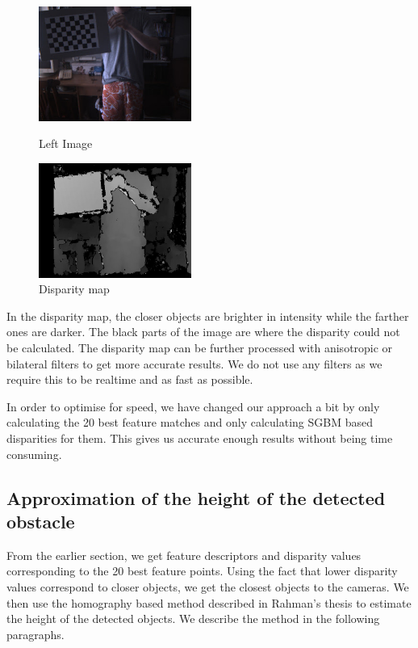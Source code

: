 \documentclass[11pt]{report}
\begin{document}
\begin{figure}
\centering
\parbox{5cm}{
\includegraphics[width=5cm]{left.jpg}
\caption{Left Image}
\label{fig:2figsA}}
\qquad
\begin{minipage}{5cm}
\includegraphics[width=5cm]{disp.jpg}
\caption{Disparity map}
\label{fig:2figsB}
\end{minipage}
\end{figure}




In the disparity map, the closer objects are brighter in intensity while the farther ones are darker. The black parts of the image are where the disparity could not be calculated. The disparity map can be further processed with anisotropic or bilateral filters to get more accurate results. We do not use any filters as we require this to be realtime and as fast as possible. 

In order to optimise for speed, we have changed our approach a bit by only calculating the 20 best feature matches and only calculating SGBM based disparities for them. This gives us accurate enough results without being time consuming. 

\label{height}
\subsection{Approximation of the height of the detected obstacle}

From the earlier section, we get feature descriptors and disparity values corresponding to the 20 best feature points. Using the fact that lower disparity values correspond to closer objects, we get the closest objects to the cameras. We then use the homography based method described in Rahman's thesis\cite{obstacleavoidance} to estimate the height of the detected objects. We describe the method in the following paragraphs.
\end{document}
